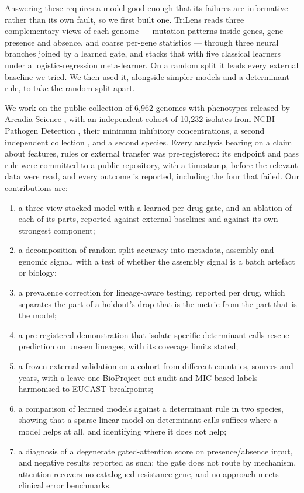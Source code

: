 Answering these requires a model good enough that its failures are informative rather than its own
fault, so we first built one. TriLens reads three complementary views of each genome --- mutation
patterns inside genes, gene presence and absence, and coarse per-gene statistics --- through three
neural branches joined by a learned gate, and stacks that with five classical learners under a
logistic-regression meta-learner. On a random split it leads every external baseline we tried. We
then used it, alongside simpler models and a determinant rule, to take the random split apart.

We work on the public collection of 6,962 \Ecoli{} genomes with phenotypes released by Arcadia
Science \cite{arcadia2024dataset,bell2025arcadia}, with an independent cohort of 10,232 isolates
from NCBI Pathogen Detection \cite{ncbi_pathogen_detection}, their minimum inhibitory
concentrations, a second independent \Ecoli{} collection \cite{ren2022giessen}, and a second
species. Every analysis bearing on a claim about features, rules or external transfer was
pre-registered: its endpoint and pass rule were committed to a public repository, with a timestamp,
before the relevant data were read, and every outcome is reported, including the four that failed.
Our contributions are:

\begin{enumerate}
  \item a three-view stacked model with a learned per-drug gate, and an ablation of each of its
        parts, reported against external baselines and against its own strongest component;
  \item a decomposition of random-split accuracy into metadata, assembly and genomic signal, with a
        test of whether the assembly signal is a batch artefact or biology;
  \item a prevalence correction for lineage-aware testing, reported per drug, which separates the
        part of a holdout's drop that is the metric from the part that is the model;
  \item a pre-registered demonstration that isolate-specific determinant calls rescue prediction on
        unseen lineages, with its coverage limits stated;
  \item a frozen external validation on a cohort from different countries, sources and years, with
        a leave-one-BioProject-out audit and MIC-based labels harmonised to EUCAST breakpoints;
  \item a comparison of learned models against a determinant rule in two species, showing that a
        sparse linear model on determinant calls suffices where a model helps at all, and
        identifying where it does not help;
  \item a diagnosis of a degenerate gated-attention score on presence/absence input, and negative
        results reported as such: the gate does not route by mechanism, attention recovers no
        catalogued resistance gene, and no approach meets clinical error benchmarks.
\end{enumerate}

